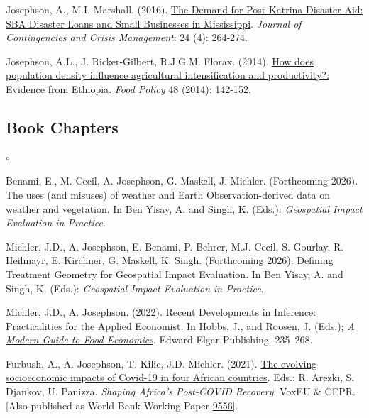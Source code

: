 \documentclass[letterpaper]{article}
\begin{document}
\begin{etaremune}
\item Josephson, A., M.I. Marshall. (2016). \href{http://onlinelibrary.wiley.com.ezproxy.lib.purdue.edu/doi/10.1111/1468-5973.12122/full}{The Demand for Post-Katrina Disaster Aid: SBA Disaster Loans and Small Businesses in Mississippi}. \textit{Journal of Contingencies and Crisis Management}: 24 (4): 264-274.   

\item  Josephson, A.L., J. Ricker-Gilbert, R.J.G.M. Florax. (2014). \href{http://www.sciencedirect.com/science/article/pii/S030691921400044X}{How does population density influence agricultural intensification and productivity?: Evidence from Ethiopia}. \textit{Food Policy} 48 (2014): 142-152. 

   \end{etaremune}

\renewenvironment{itemize}{
	\begin{list}{$\circ$}{
			\setlength{\leftmargin}{1.5em}
		}
	}{
	\end{list}
}

\subsection*{Book Chapters}

\begin{itemize}

\item Benami, E., M. Cecil, A. Josephson, G. Maskell, J. Michler. (Forthcoming 2026). The uses (and misuses) of weather and Earth Observation-derived data on weather and vegetation. In Ben Yisay, A. and Singh, K. (Eds.): \emph{Geospatial Impact Evaluation in Practice}. 

\item Michler, J.D., A. Josephson, E. Benami, P. Behrer, M.J. Cecil, S. Gourlay, R. Heilmayr, E. Kirchner, G. Maskell, K. Singh. (Forthcoming 2026). Defining Treatment Geometry for Geospatial Impact Evaluation. In Ben Yisay, A. and Singh, K. (Eds.): \emph{Geospatial Impact Evaluation in Practice}. 
    
\item Michler, J.D., A. Josephson. (2022). Recent Developments in Inference: Practicalities for the Applied Economist. In Hobbs, J., and Roosen, J. (Eds.); \emph{\href{https://www.elgaronline.com/view/edcoll/9781800372047/9781800372047.xml}{A Modern Guide to Food Economics}}. Edward Elgar Publishing. 235–268.  
	
\item Furbush, A., A. Josephson, T. Kilic, J.D. Michler. (2021). \href{https://voxeu.org/content/shaping-africa-s-post-covid-recovery}{The evolving socioeconomic impacts of Covid-19 in four African countries}. Eds.: R. Arezki, S. Djankov, U. Panizza. \emph{Shaping Africa's Post-COVID Recovery}. VoxEU \& CEPR.  [Also published as World Bank Working Paper \href{https://documents.worldbank.org/en/publication/documents-reports/documentdetail/810651614623398314/the-evolving-socioeconomic-impacts-of-covid-19-in-four-african-countries}{9556}].
\end{itemize}
\end{document}
